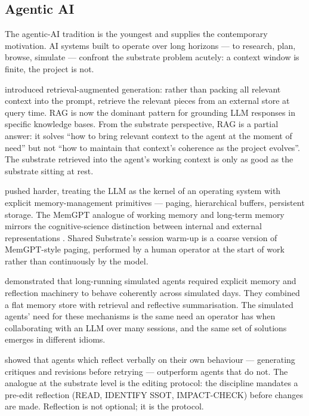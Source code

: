 \documentclass[11pt,a4paper,twocolumn]{article}
\begin{document}
\subsection{Agentic AI}

The agentic-AI tradition is the youngest and supplies the
contemporary motivation. AI systems built to operate over long
horizons --- to research, plan, browse, simulate --- confront the
substrate problem acutely: a context window is finite, the project
is not.

\citet{lewis2020rag} introduced retrieval-augmented generation: rather
than packing all relevant context into the prompt, retrieve the
relevant pieces from an external store at query time. RAG is now the
dominant pattern for grounding LLM responses in specific knowledge
bases. From the substrate perspective, RAG is a partial
answer: it solves ``how to bring relevant context to the agent at
the moment of need'' but not ``how to maintain that context's
coherence as the project evolves''. The substrate retrieved into
the agent's working context is only as good as the substrate
sitting at rest.

\citet{packer2024memgpt} pushed harder, treating the LLM as the
kernel of an operating system with explicit memory-management
primitives --- paging, hierarchical buffers, persistent storage.
The MemGPT analogue of working memory and long-term memory mirrors
the cognitive-science distinction between internal and external
representations \citep{scaife1996external}. Shared Substrate's
session warm-up is a coarse version of MemGPT-style paging,
performed by a human operator at the start of work rather than
continuously by the model.

\citet{park2023generativeagents} demonstrated that long-running
simulated agents required explicit memory and reflection machinery
to behave coherently across simulated days. They combined a flat
memory store with retrieval and reflective summarisation. The
simulated agents' need for these mechanisms is the same need an
operator has when collaborating with an LLM over many sessions,
and the same set of solutions emerges in different idioms.

\citet{shinn2023reflexion} showed that agents which reflect verbally
on their own behaviour --- generating critiques and revisions
before retrying --- outperform agents that do not. The analogue at
the substrate level is the editing protocol: the discipline mandates
a pre-edit reflection (READ, IDENTIFY SSOT, IMPACT-CHECK) before
changes are made. Reflection is not optional; it is the protocol.
\end{document}

